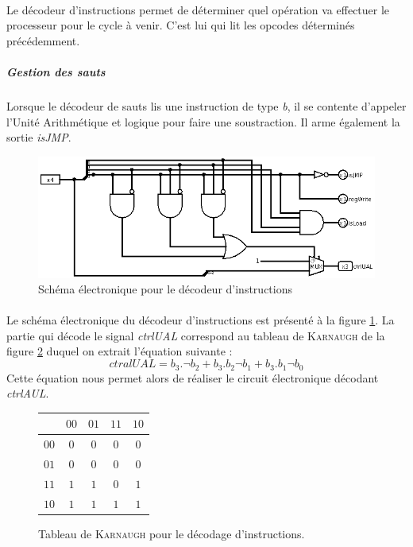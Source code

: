 \paragraph{}{
	Le décodeur d'instructions permet de déterminer quel opération va effectuer
	le processeur pour le cycle à venir. C'est lui qui lit les opcodes déterminés
	précédemment.
}
	\subparagraph{Gestion des sauts}{
		Lorsque le décodeur de sauts lis une instruction de type \textit{b},
		il se contente d'appeler l'Unité Arithmétique et logique pour faire
		une soustraction. Il arme également la sortie \textit{isJMP}.
	}

\begin{figure}
	\centering
	\includegraphics[scale=0.4,origin=c]{circuits/deco_instru.png}
	\caption{
		\label{decod_inst_circ}
		Sch\'{e}ma \'{e}lectronique pour le d\'{e}codeur d'instructions
		}
\end{figure}

\paragraph{}{
	Le schéma électronique du décodeur d'instructions est présenté à la figure
	\ref{decod_inst_circ}. La partie qui décode le signal \textit{ctrlUAL} 
	correspond au tableau de \textsc{Karnaugh} de la figure 
	\ref{decod_ctrlual_karnaugh} duquel on extrait l'équation suivante :
	\begin{equation}
		ctralUAL = b_{3} . \neg b_{2} + b_{3} . b_{2} \neg b_{1}  + b_{3} . b_{1} \neg b_{0}
		\label{equation_ual}
	\end{equation}
	Cette équation nous permet alors de réaliser le circuit électronique 
	décodant \textit{ctrlAUL}.
}

\begin{figure}
	\begin{center}
	\centering
	\begin{tabular}{|c|c|c|c|c|}
		\hline
		\backslashbox{$b_{3}b_{2}$}{$b_{1}b_{0}$} & $00$ & $01$ & $11$ & $10$ \\ 
		\hline 
		$00$ & $0$ & $0$ & $0$ & $0$ \\ 
		\hline 
		$01$ & $0$ & $0$ & $0$ & $0$ \\ 
		\hline 
		$11$ & $1$ & $1$ & $0$ & $1$ \\ 
		\hline 
		$10$ & $1$ & $1$ & $1$ & $1$ \\ 
		\hline 
	\end{tabular} 
	\end{center}
	\caption{
		\label{decod_ctrlual_karnaugh}
		Tableau de \textsc{Karnaugh} pour le décodage d'instructions.
	}
\end{figure}